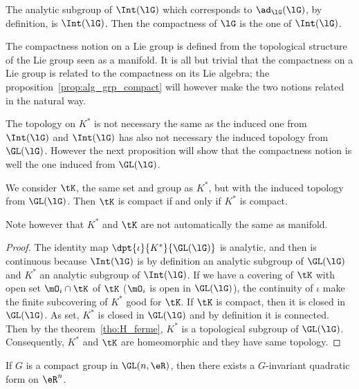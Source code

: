The analytic subgroup of $\Int(\lG)$ which corresponds to $\ad_{\lG}(\lG)$, by definition, is $\Int(\lG)$. Then the compactness of $\lG$ is the one of $\Int(\lG)$.

\begin{remark}
	The compactness notion on a Lie group is defined from the topological structure of the Lie group seen as a manifold. It is all but trivial that the compactness on a Lie group is related to the compactness on its Lie algebra; the proposition~\ref{prop:alg_grp_compact} will however make the two notions related in the natural way.
\end{remark}

\begin{remark}
	The topology on $K^*$ is not necessary the same as the induced one from $\Int(\lG)$ and $\Int(\lG)$ has also not necessary the induced topology from $\GL(\lG)$. However the next proposition will show that the compactness notion is well the one induced from $\GL(\lG)$.
\end{remark}

\begin{proposition}
	We consider $\tK$, the same set and group as $K^*$, but with the induced topology from $\GL(\lG)$. Then $\tK$ is compact if and only if $K^*$ is compact.
\end{proposition}

Note however that $K^*$ and $\tK$ are not automatically the same as manifold.

\begin{proof}
	The identity map $\dpt{\iota}{K^*}{\GL(\lG)}$ is analytic, and then is continuous because $\Int(\lG)$ is by definition an analytic subgroup of $\GL(\lG)$ and $K^*$ an analytic subgroup of $\Int(\lG)$. If we have a covering of $\tK$ with open set $\mO_i\cap\tK$ of $\tK$ ($\mO_i$ is open in $\GL(\lG)$), the continuity of $\iota$ make the finite subcovering of $K^*$ good for $\tK$.
	If $\tK$ is compact, then it is closed in $\GL(\lG)$. As set, $K^*$ is closed in $\GL(\lG)$ and by definition it is connected. Then by the theorem~\ref{tho:H_ferme}, $K^*$ is a topological subgroup of $\GL(\lG)$. Consequently, $K^*$ and $\tK$ are homeomorphic and they have same topology.
\end{proof}

\begin{lemma}
	If $G$ is a compact group in $\GL(n,\eR)$, then there exists a $G$-invariant quadratic form on $\eR^n$.
\end{lemma}

